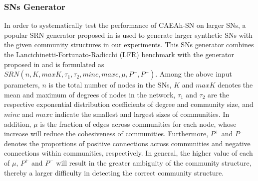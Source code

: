 \documentclass[10pt, journal]{IEEEtran}
\begin{document}
\subsubsection{SNs Generator}\label{section:experiment:synthetic:generator}
In order to systematically test the performance of CAEAh-SN on larger SNs, a popular SRN generator proposed in \cite{yang2007community} is used to generate larger synthetic SNs with the given community structures in our experiments. This SNs generator combines the Lancichinetti-Fortunato-Radicchi (LFR) benchmark with the generator proposed in \cite{yang2007community} and is formulated as $SRN(n,K,maxK,\tau_1,\tau_2,minc,maxc,\mu,P^+,P^-)$.
Among the above input parameters, $n$ is the total number of nodes in the SNs, $K$ and $maxK$ denotes the mean and maximum of degrees of nodes in the network, $\tau_1$ and $\tau_2$ are the respective exponential distribution coefficients of degree and community size, and $minc$ and $maxc$ indicate the smallest and largest sizes of communities. In addition, $\mu$ is the fraction of edges across communities for each node, whose increase will reduce the cohesiveness of communities.
Furthermore, $P^+$ and $P^-$ denotes the proportions of positive connections across communities and negative connections within communities, respectively.
In general, the higher value of each of $\mu$, $P^+$ and $P^-$ will result in the greater ambiguity of the community structure, thereby a larger difficulty in detecting the correct community structure.


\end{document}
